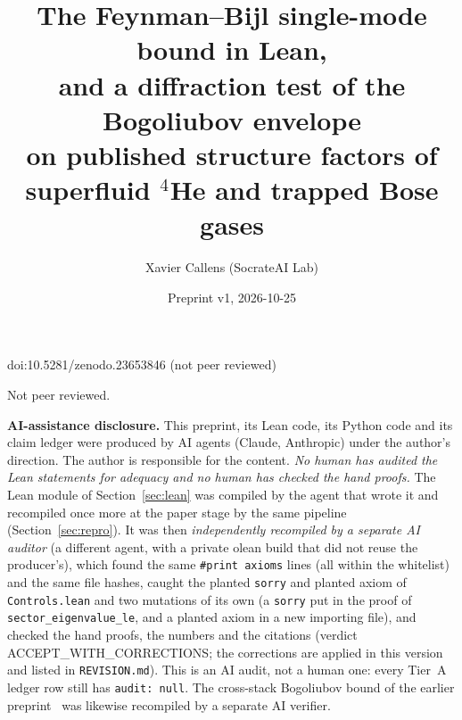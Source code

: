 \documentclass[11pt]{article}
\title{The Feynman--Bijl single-mode bound in Lean,\\ and a diffraction test of the Bogoliubov envelope\\
on published structure factors of superfluid $^4$He and trapped Bose gases}
\author{Xavier Callens (SocrateAI Lab)}
\date{Preprint v1, 2026-10-25}
\theoremstyle{remark}
\newcommand{\lean}[1]{\texttt{#1}}
\begin{document}
\maketitle
\begin{center}\small doi:10.5281/zenodo.23653846 \quad (not peer reviewed)\end{center}

\begin{center}\small Not peer reviewed.\end{center}

\noindent\textbf{AI-assistance disclosure.} This preprint, its Lean code, its Python code and its claim ledger were produced
by AI agents (Claude, Anthropic) under the author's direction. The author is responsible for the content. \emph{No human has
audited the Lean statements for adequacy and no human has checked the hand proofs.} The Lean module of
Section~\ref{sec:lean} was compiled by the agent that wrote it and recompiled once more at the paper stage by the same
pipeline (Section~\ref{sec:repro}). It was then \emph{independently recompiled by a separate AI auditor} (a different agent, with a
private olean build that did not reuse the producer's), which found the same \lean{\#print axioms} lines (all within the whitelist) and
the same file hashes, caught the planted \lean{sorry} and planted axiom of \texttt{Controls.lean} and two mutations of its own (a \lean{sorry} put
in the proof of \lean{sector\_eigenvalue\_le}, and a planted axiom in a new importing file), and checked the hand proofs, the
numbers and the citations (verdict ACCEPT\_WITH\_CORRECTIONS; the corrections are applied in this version and listed in
\texttt{REVISION.md}). This is an AI audit, not a human one: every Tier~A ledger row still has \texttt{audit: null}. The cross-stack Bogoliubov bound of
the earlier preprint~\cite{bsk} was likewise recompiled by a separate AI verifier.
\end{document}
